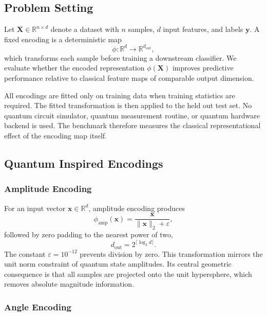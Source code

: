 \documentclass[12pt]{article}
\newcommand{\dout}{d_{\mathrm{out}}}
\newcommand{\Rbb}{\mathbb{R}}
\begin{document}
\subsection{Problem Setting}
\label{sec:problem}

Let $\mathbf{X}\in\Rbb^{n\times d}$ denote a dataset with $n$ samples, $d$
input features, and labels $\mathbf{y}$. A fixed encoding is a deterministic map
\begin{equation}
    \phi: \Rbb^d \rightarrow \Rbb^{\dout},
\end{equation}
which transforms each sample before training a downstream classifier. We
evaluate whether the encoded representation $\phi(\mathbf{X})$ improves
predictive performance relative to classical feature maps of comparable output
dimension.

All encodings are fitted only on training data when training statistics are
required. The fitted transformation is then applied to the held out test set. No
quantum circuit simulator, quantum measurement routine, or quantum hardware
backend is used. The benchmark therefore measures the classical
representational effect of the encoding map itself.

\subsection{Quantum Inspired Encodings}
\label{sec:encodings}

\subsubsection{Amplitude Encoding}

For an input vector $\mathbf{x}\in\Rbb^d$, amplitude encoding produces
\begin{equation}
  \phi_{\mathrm{amp}}(\mathbf{x}) =
    \frac{\mathbf{x}}{\|\mathbf{x}\|_2 + \varepsilon},
  \label{eq:amplitude}
\end{equation}
followed by zero padding to the nearest power of two,
\begin{equation}
  \dout = 2^{\lceil \log_2 d \rceil}.
\end{equation}
The constant $\varepsilon=10^{-12}$ prevents division by zero. This
transformation mirrors the unit norm constraint of quantum state amplitudes.
Its central geometric consequence is that all samples are projected onto the
unit hypersphere, which removes absolute magnitude information.

\subsubsection{Angle Encoding}
\end{document}
